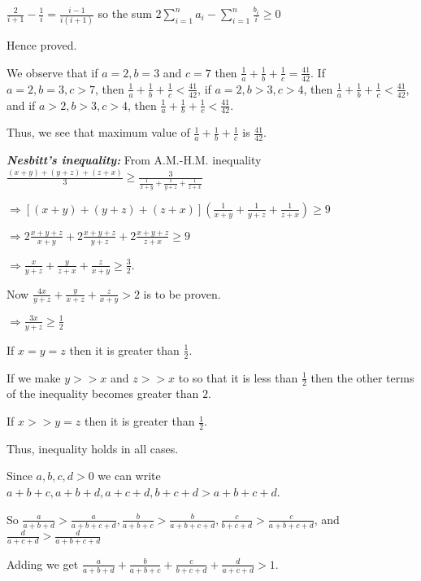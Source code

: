   $\frac{2}{i + 1} - \frac{1}{i} = \frac{i - 1}{i(i + 1)}$ so the sum $2\displaystyle\sum_{i = 1}^na_i -
  \sum_{i=1}^n\frac{b_i}{i} \geq 0$

  Hence proved.
\item We observe that if $a = 2, b = 3$ and $c = 7$ then $\frac{1}{a} +
  \frac{1}{b} + \frac{1}{c} = \frac{41}{42}$. If $a = 2, b = 3, c > 7$, then $\frac{1}{a} + \frac{1}{b} +
  \frac{1}{c} < \frac{41}{42}$, if $a = 2, b > 3, c > 4$, then $\frac{1}{a} + \frac{1}{b} + \frac{1}{c} <
  \frac{41}{42}$, and if $a > 2, b > 3, c > 4$, then $\frac{1}{a} + \frac{1}{b} + \frac{1}{c} <
  \frac{41}{42}$.

  Thus, we see that maximum value of $\frac{1}{a} + \frac{1}{b} + \frac{1}{c}$ is $\frac{41}{42}$.
\item {\bf{\it Nesbitt's inequality:}} From A.M.-H.M. inequality $\frac{(x + y) + (y + z) + (z + x)}{3}\geq
  \frac{3}{\frac{1}{x + y} + \frac{1}{y + z} + \frac{1}{z + x}}$

  $\Rightarrow \left[(x + y) + (y + z) + (z + x)\right]\left(\frac{1}{x + y} + \frac{1}{y + z} + \frac{1}{z
  + x}\right)\geq 9$

  $\Rightarrow 2\frac{x + y + z}{x + y} + 2\frac{x + y + z}{y + z} + 2\frac{x + y + z}{z + x}\geq 9$

  $\Rightarrow \frac{x}{y + z} + \frac{y}{z + x} + \frac{z}{x + y}\geq \frac{3}{2}$.

  Now $\frac{4x}{y + z} + \frac{y}{x + z} + \frac{z}{x + y} > 2$ is to be proven.

  $\Rightarrow \frac{3x}{y + z}\geq \frac{1}{2}$

  If $x = y = z$ then it is greater than $\frac{1}{2}$.

  If we make $y >> x$ and $z >> x$ to so that it is less than $\frac{1}{2}$ then the other terms of the
  inequality becomes greater than $2$.

  If $x >> y = z$ then it is greater than $\frac{1}{2}$.

  Thus, inequality holds in all cases.
\item Since $a, b, c, d > 0$ we can write $a + b + c, a + b + d, a + c + d, b + c + d > a + b + c + d$.

  So $\frac{a}{a + b + d} > \frac{a}{a + b + c + d}, \frac{b}{a + b + c} > \frac{b}{a + b + c + d},
  \frac{c}{b + c + d} > \frac{c}{a + b + c + d}$, and $\frac{d}{a + c + d} > \frac{d}{a + b + c + d}$

  Adding we get $\frac{a}{a + b + d} + \frac{b}{a + b + c} + \frac{c}{b + c + d} + \frac{d}{a + c + d} > 1$.


